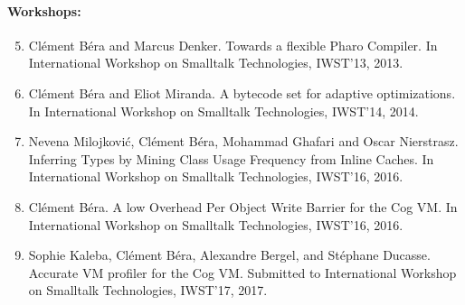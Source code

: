 \documentclass[a4paper,12pt,twoside]{../includes/ThesisStyle}
\begin{document}
\paragraph{Workshops:}
\begin{enumerate}
	\setcounter{enumi}{4}
	\item Cl\'ement B\'era and Marcus Denker. Towards a flexible Pharo Compiler. In International Workshop on Smalltalk Technologies, IWST'13, 2013.
	\item Cl\'ement B\'era and Eliot Miranda. A bytecode set for adaptive optimizations. In International Workshop on Smalltalk Technologies, IWST'14, 2014.
	\item Nevena Milojkovi\'c, Cl\'ement B\'era, Mohammad Ghafari and Oscar Nierstrasz. Inferring Types by Mining Class Usage Frequency from Inline Caches. In International Workshop on Smalltalk Technologies, IWST'16, 2016.
	\item Cl\'ement B\'era. A low Overhead Per Object Write Barrier for the Cog VM. In International Workshop on Smalltalk Technologies, IWST'16, 2016.
\end{enumerate}	
\begin{enumerate}[label=(\arabic*)]
	\setcounter{enumi}{8}
	\item Sophie Kaleba, Cl\'ement B\'era, Alexandre Bergel, and St\'ephane Ducasse. Accurate VM profiler for the Cog VM. Submitted to International Workshop on Smalltalk Technologies, IWST'17, 2017.
\end{enumerate}

\ifx\wholebook\relax\else
    
\end{document}
